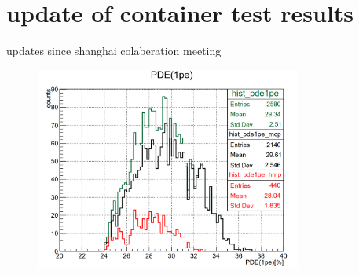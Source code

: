 %
\section{update of container test results}
\begin{frame}{updates since shanghai colaberation meeting}
\begin{figure}
\centering
\includegraphics[width=0.78\textwidth]{figures/zr01.png} %
\end{figure}
\end{frame}
